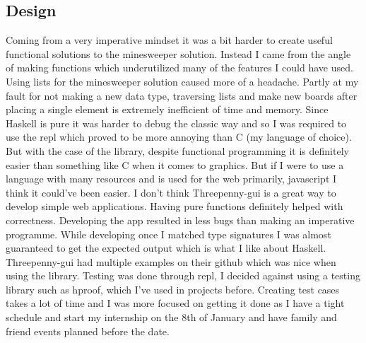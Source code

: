 \documentclass{article} %
\begin{document}
\subsection{Design}
Coming from a very imperative mindset it was a bit harder to create useful functional solutions to the minesweeper solution. Instead I came from 
the angle of making functions which underutilized many of the features I could have used. Using lists for the minesweeper solution caused more 
of a headache. Partly at my fault for not making a new data type, traversing lists and make new boards after placing a single element is extremely inefficient
of time and memory. Since Haskell is pure it was harder to debug the classic way and so I was required to use the repl which proved to be more annoying
than C (my language of choice). But with the case of the library, despite functional programming it is definitely easier than something like C when 
it comes to graphics. But if I were to use a language with many resources and is used for the web primarily, javascript I think it could've been easier.
I don't think Threepenny-gui is a great way to develop simple web applications. Having pure functions definitely helped with correctness. Developing the
app resulted in less bugs than making an imperative programme. While developing once I matched type signatures I was almost guaranteed to get the expected
output which is what I like about Haskell. Threepenny-gui had multiple examples on their github which was nice when using the library. 
Testing was done through repl, I decided against using a testing library such as hproof, which I've used in projects before. 
Creating test cases takes a lot of time and I was more focused on getting it done as I have a tight schedule and start my internship on the 8th of 
January and have family and friend events planned before the date.
\end{document}
